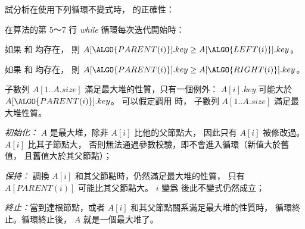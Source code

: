 \startEXERCISE
試分析在使用下列循環不變式時，  的正確性：

在算法的第 5～7 行 \emph{while} 循環每次迭代開始時：
\startigBase[a]
\item 如果  和  均存在，
則 $A[\ALGO{PARENT(i)}].key \ge A[\ALGO{LEFT(i)}].key$。

\item 如果  和  均存在，
則 $A[\ALGO{PARENT(i)}].key \ge A[\ALGO{RIGHT(i)}].key$。

\item 子數列 $A[1..A.size]$ 滿足最大堆的性質，只有一個例外：
$A[i].key$ 可能大於 $A[\ALGO{PARENT(i)}].key$。
\stopigBase
可以假定調用  時，
子數列 $A[1..A.size]$ 滿足最大堆性質。
\stopEXERCISE

\startANSWER
\emph{初始化：} $A$ 是最大堆，除非 $A[i]$ 比他的父節點大，
因此只有 $A[i]$ 被修改過。 $A[i]$ 比其子節點大，
否則無法通過參數校驗，即不會進入循環（新值大於舊值，
 且舊值大於其父節點）；

\emph{保持：} 調換 $A[i]$ 和其父節點時，仍然滿足最大堆的性質，
只有 $A[PARENT(i)]$ 可能比其父節點大。
 $i$ 變爲  後此不變式仍然成立；

\emph{終止：}當到達根節點，或者 $A[i]$ 和其父節點關系滿足最大堆的性質時，
循環終止。循環終止後， $A$ 就是一個最大堆了。
\stopANSWER
